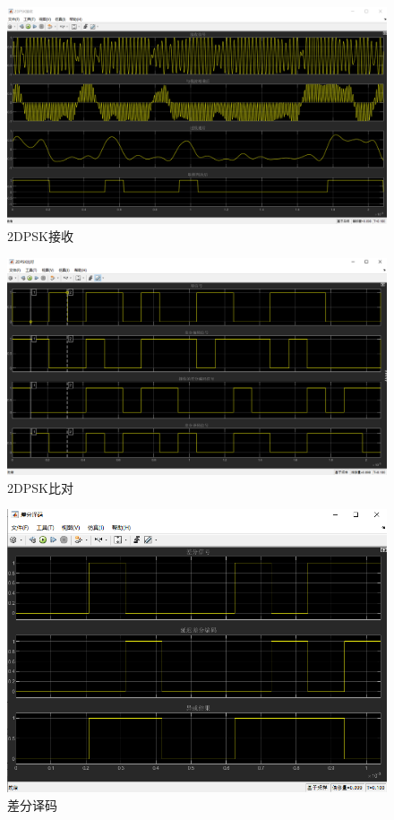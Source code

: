 \documentclass[11pt]{paper}
\begin{document}
\begin{figure}[H]
    \centering
    \includegraphics[width=5.9in]{texture/result/2dpsk接收结果.png}
    \caption{2DPSK接收}
    \label{2DPSK接收}
\end{figure}

\begin{figure}[H]
    \centering
    \includegraphics[width=5.9in]{texture/result/2dpsk比对.png}
    \caption{2DPSK比对}
    \label{2DPSK比对}
\end{figure}

\begin{figure}[H]
    \centering
    \includegraphics[width=5.9in]{texture/result/差分译码.png}
    \caption{差分译码}
    \label{差分译码}
\end{figure}
\end{document}

